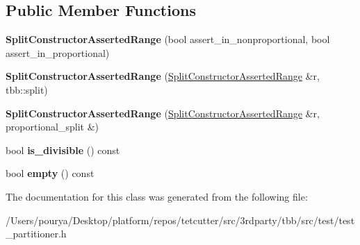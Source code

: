 \subsection*{Public Member Functions}
\begin{DoxyCompactItemize}
\item 
\hypertarget{classtest__partitioner__utils_1_1interaction__with__range__and__partitioner_1_1SplitConstructorAssertedRange_a8d69511a33b77177098b67a5a687c46f}{}{\bfseries Split\+Constructor\+Asserted\+Range} (bool assert\+\_\+in\+\_\+nonproportional, bool assert\+\_\+in\+\_\+proportional)\label{classtest__partitioner__utils_1_1interaction__with__range__and__partitioner_1_1SplitConstructorAssertedRange_a8d69511a33b77177098b67a5a687c46f}

\item 
\hypertarget{classtest__partitioner__utils_1_1interaction__with__range__and__partitioner_1_1SplitConstructorAssertedRange_a9adc5ff49c2813c13e4bb1236cd9a452}{}{\bfseries Split\+Constructor\+Asserted\+Range} (\hyperlink{classtest__partitioner__utils_1_1interaction__with__range__and__partitioner_1_1SplitConstructorAssertedRange}{Split\+Constructor\+Asserted\+Range} \&r, tbb\+::split)\label{classtest__partitioner__utils_1_1interaction__with__range__and__partitioner_1_1SplitConstructorAssertedRange_a9adc5ff49c2813c13e4bb1236cd9a452}

\item 
\hypertarget{classtest__partitioner__utils_1_1interaction__with__range__and__partitioner_1_1SplitConstructorAssertedRange_af73201cd1642190b9c4c188157898f14}{}{\bfseries Split\+Constructor\+Asserted\+Range} (\hyperlink{classtest__partitioner__utils_1_1interaction__with__range__and__partitioner_1_1SplitConstructorAssertedRange}{Split\+Constructor\+Asserted\+Range} \&r, proportional\+\_\+split \&)\label{classtest__partitioner__utils_1_1interaction__with__range__and__partitioner_1_1SplitConstructorAssertedRange_af73201cd1642190b9c4c188157898f14}

\item 
\hypertarget{classtest__partitioner__utils_1_1interaction__with__range__and__partitioner_1_1SplitConstructorAssertedRange_a72056c1a48ecd19c35545c46e5d3a12b}{}bool {\bfseries is\+\_\+divisible} () const \label{classtest__partitioner__utils_1_1interaction__with__range__and__partitioner_1_1SplitConstructorAssertedRange_a72056c1a48ecd19c35545c46e5d3a12b}

\item 
\hypertarget{classtest__partitioner__utils_1_1interaction__with__range__and__partitioner_1_1SplitConstructorAssertedRange_ad618c00782ac7fe3d07b4a57885d9be1}{}bool {\bfseries empty} () const \label{classtest__partitioner__utils_1_1interaction__with__range__and__partitioner_1_1SplitConstructorAssertedRange_ad618c00782ac7fe3d07b4a57885d9be1}

\end{DoxyCompactItemize}


The documentation for this class was generated from the following file\+:\begin{DoxyCompactItemize}
\item 
/\+Users/pourya/\+Desktop/platform/repos/tetcutter/src/3rdparty/tbb/src/test/test\+\_\+partitioner.\+h\end{DoxyCompactItemize}
